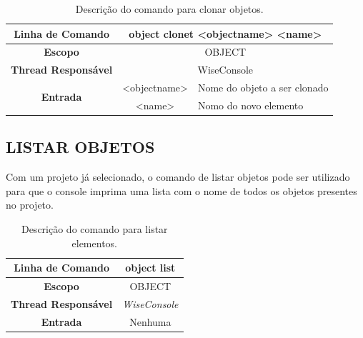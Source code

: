 \begin{center}
	\begin{table}[!htbp]
		\begin{tabularx}{\textwidth}{c|c|X}
			\toprule
			\textbf{Linha de Comando} & \multicolumn{2}{c}{object clonet <object\underline{\space\space}name> <name>} \\
			\midrule
			\textbf{Escopo} & \multicolumn{2}{c}{OBJECT} \\
			\hline
			\textbf{Thread Responsável} & \multicolumn{2}{c}{WiseConsole} \\
			\hline
			\multirow{2}{*}{\textbf{Entrada}} & <object\underline{\space\space}name> & Nome do objeto a ser clonado \\
			
			& <name> & Nomo do novo elemento \\
			\bottomrule
		\end{tabularx}
		\caption{Descrição do comando para clonar objetos.}
		\label{tab:clone_object}
	\end{table}
\end{center}

\subsection{LISTAR OBJETOS}\label{sec:list_object}

Com um projeto já selecionado, o comando de listar objetos pode ser utilizado para que o console imprima uma lista com o nome de todos os objetos presentes no projeto.

\begin{center}
	\begin{table}[!htbp]
		\begin{tabularx}{\textwidth}{c|X}
			\toprule
			\textbf{Linha de Comando} & \multicolumn{1}{c}{object list} \\
			\midrule
			\textbf{Escopo} & \multicolumn{1}{c}{OBJECT} \\
			\hline
			\textbf{Thread Responsável} & \multicolumn{1}{c}{\textit{WiseConsole}} \\
			\hline
			\textbf{Entrada} & \multicolumn{1}{c}{Nenhuma} \\
			\bottomrule
		\end{tabularx}
		\caption{Descrição do comando para listar elementos.}
		\label{tab:list_object}
	\end{table}
\end{center}

